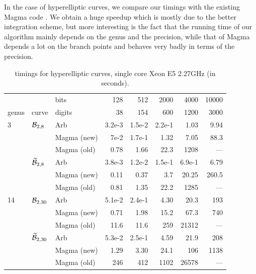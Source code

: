\documentclass[main.tex]{subfiles}
\begin{document}
  In the case of hyperelliptic curves, we compare our timings with the existing
  Magma code \cite{vanWamelen06}. We obtain a huge speedup which is mostly due
  to the better integration scheme, but more interesting is the fact that the
  running time of our algorithm mainly depends on the genus and the precision,
  while that of Magma depends a lot on the branch points and behaves very badly
  in terms of the precision.

  \begin{table}[H]
      \begin{center}
          \begin{tabular}{lllrrrrr}
              \toprule
              & & \hfill bits & 128 & 512 & 2000 & 4000 & 10000 \\
              genus & curve & \hfill digits & 38 & 154 & 600 & 1200 & 3000 \\
              \midrule
              3 & $\mathcal{B}_{2,8}$
              & Arb   & 3.2e-3 & 1.5e-2 & 2.2e-1 & 1.03 & 9.94 \\
              & & Magma (new) & 7e-2 & 1.7e-1 & 1.32 & 7.05 & 88.3 \\
              & & Magma (old) & 0.78 & 1.66 & 22.3 & 1208 & --- \\
              \cmidrule{3-8}
              & $\widetilde{\mathcal{B}}_{2,8}$
              & Arb & 3.8e-3 & 1.2e-2 & 1.5e-1 & 6.9e-1 & 6.79 \\
              & & Magma (new) & 0.11 & 0.37 & 3.7 & 20.25 & 260.5 \\
              & & Magma (old) & 0.81 & 1.35 & 22.2 & 1285 & --- \\
              \midrule
              14 & $\mathcal{B}_{2,30}$
              & Arb & 5.1e-2 & 2.4e-1 & 4.30 & 20.3 & 193 \\
              & & Magma (new) & 0.71 & 1.98 & 15.2 & 67.3 & 740 \\
              & & Magma (old) & 11.6 & 11.6 & 259 & 21312 & --- \\
              \cmidrule{3-8}
              & $\widetilde{\mathcal{B}}_{2,30}$
              & Arb & 5.3e-2 & 2.5e-1 & 4.59 & 21.9 & 208 \\
              & & Magma (new) & 1.29 & 3.30 & 24.1 & 106 & 1138 \\
              & & Magma (old) & 246 & 412 & 1102 & 26578 & --- \\
              \bottomrule
          \end{tabular}
          \caption{timings for hyperelliptic curves, single core Xeon E5 2.27GHz (in seconds).}
      \end{center}
  \end{table}
\end{document}
